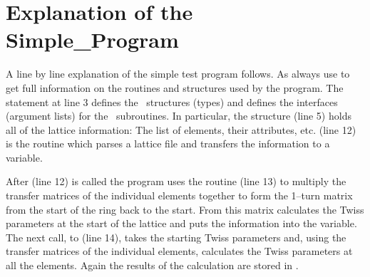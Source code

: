 \section{Explanation of the Simple\_Program}

A line by line explanation of the simple test program follows.  As
always use  to get full information on the routines and
structures used by the program. The  statement at line 3
defines the \bmad\ structures (types) and defines the interfaces
(argument lists) for the \bmad\ subroutines. In particular, the
 structure (line 5) holds all of the lattice
information: The list of elements, their attributes,
etc.  (line 12) is the routine which parses a lattice
file and transfers the information to a
 variable.

After  (line 12) is called the program uses the
routine  (line 13) to multiply the transfer
matrices of the individual elements together to form the 1--turn
matrix from the start of the ring back to the start. From this matrix
 calculates the Twiss parameters at the start of
the lattice and puts the information into the  variable. The
next call, to  (line 14), takes the starting
Twiss parameters and, using the transfer matrices of the individual
elements, calculates the Twiss parameters at all the elements. Again
the results of the calculation are stored in . 

